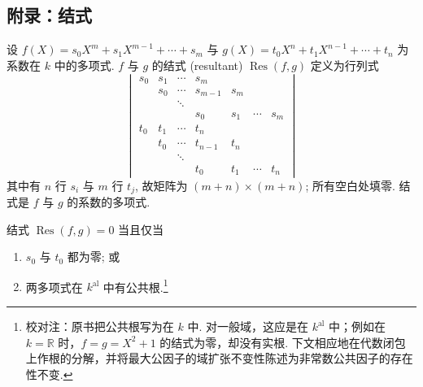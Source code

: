 \subsection*{附录：结式}

设 $f(X) = s_0X^m + s_1X^{m-1} + \cdots + s_m$ 与 $g(X) = t_0X^n + t_1X^{n-1} + \cdots + t_n$ 为系数在 $k$ 中的多项式. $f$ 与 $g$ 的结式 (resultant) $\operatorname{Res}(f,g)$ 定义为行列式
\[
\begin{vmatrix}
s_0 & s_1 & \cdots & s_m & & \\
& s_0 & \cdots & s_{m-1} & s_m & \\
& & \ddots & & & \\
& & & s_0 & s_1 & \cdots & s_m\\
t_0 & t_1 & \cdots & t_n & & \\
& t_0 & \cdots & t_{n-1} & t_n & \\
& & \ddots & & & \\
& & & t_0 & t_1 & \cdots & t_n
\end{vmatrix}
\]
其中有 $n$ 行 $s_i$ 与 $m$ 行 $t_j$, 故矩阵为 $(m+n)\times(m+n)$; 所有空白处填零. 结式是 $f$ 与 $g$ 的系数的多项式.

\begin{proposition} \label{thm:1.1.22} 
结式 $\operatorname{Res}(f,g) = 0$ 当且仅当
\begin{enumerate}[label=\textup{(\alph*)}]
\item $s_0$ 与 $t_0$ 都为零; 或
\item 两多项式在 $k^{\mathrm{al}}$ 中有公共根.\footnote{校对注：原书把公共根写为在 $k$ 中. 对一般域，这应是在 $k^{\mathrm{al}}$ 中；例如在 $k=\mathbb{R}$ 时，$f=g=X^2+1$ 的结式为零，却没有实根. 下文相应地在代数闭包上作根的分解，并将最大公因子的域扩张不变性陈述为非常数公共因子的存在性不变.}
\end{enumerate}
\end{proposition}

